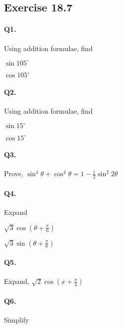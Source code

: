 \documentclass{article}
\begin{document}
\subsection {Exercise 18.7}
\paragraph{Q1.}
Using addition formulae, find

\begin{enumerate*}[label=\roman*)]
  \item $\sin 105^{\circ}$
  \item $\cos 105^{\circ}$
\end{enumerate*}

\paragraph{Q2.}
Using addition formulae, find

\begin{enumerate*}[label=\roman*)]
  \item $\sin 15^{\circ}$
  \item $\cos 15^{\circ}$
\end{enumerate*}

\paragraph{Q3.}
Prove, $\sin^{4}\theta + \cos^{4}\theta = 1 - \frac{1}{2}\sin^{2}2\theta$

\paragraph{Q4.}
Expand

\begin{enumerate*}[label=\alph*)]
  \item $\sqrt{3} \cos \left( \theta + \frac{\pi}{6} \right)$
  \item $\sqrt{3} \sin \left( \theta + \frac{\pi}{6} \right)$
\end{enumerate*}

\paragraph{Q5.}
Expand, $\sqrt{2} \cos \left( x + \frac{\pi}{4} \right)$

\paragraph{Q6.}
Simplify 
\end{document}
